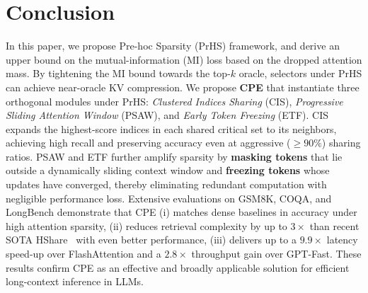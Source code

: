 \section{Conclusion}

In this paper, we propose Pre-hoc Sparsity (PrHS) framework, and derive an upper bound on the mutual-information (MI) loss based on the dropped attention mass. By tightening the MI bound towards the top-$k$ oracle, selectors under PrHS can achieve near-oracle KV compression. We propose \textbf{CPE} that instantiate three orthogonal modules under PrHS: \emph{Clustered Indices Sharing} (CIS), \emph{Progressive Sliding Attention Window} (PSAW), and \emph{Early Token Freezing} (ETF). CIS expands the highest-score indices in each shared critical set to its neighbors, achieving high recall and preserving accuracy even at aggressive (${\ge}90\%$) sharing ratios. PSAW and ETF further amplify sparsity by \textbf{masking tokens} that lie outside a dynamically sliding context window and \textbf{freezing tokens} whose updates have converged, thereby eliminating redundant computation with negligible performance loss. %
Extensive evaluations on GSM8K, COQA, and LongBench demonstrate that CPE (i) matches dense baselines in accuracy under high attention sparsity, (ii) reduces retrieval complexity by up to $3\times$ than recent SOTA HShare~\cite{wuhshare} with even better performance, (iii) delivers up to a $9.9\times$ latency speed-up over FlashAttention and a $2.8\times$ throughput gain over GPT-Fast. These results confirm CPE as an effective and broadly applicable solution for efficient long-context inference in LLMs.



